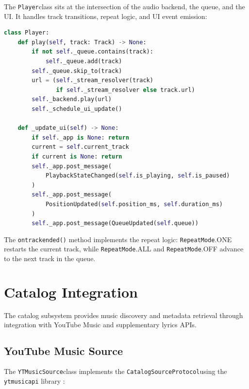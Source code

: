 \documentclass[a4paper,11pt,twoside]{article}
\newcommand{\protocol}{\texttt{Protocol}}
\newcommand{\repeatmode}{\texttt{RepeatMode}}
\newcommand{\catalogsource}{\texttt{CatalogSource}}
\newcommand{\player}{\texttt{Player}}
\newcommand{\ytmusicsource}{\texttt{YTMusicSource}}
\DeclareRobustCommand{\method}[1]{\texttt{\def\_{\textunderscore\allowbreak}#1}}
\newcommand{\ytmusicapi}{\texttt{ytmusicapi}\xspace}
\begin{document}
The \player class sits at the intersection of the audio backend, the queue,
and the UI. It handles track transitions, repeat logic, and UI event
emission:

\begin{lstlisting}[language=Python, caption={Player controller coordinating
backend, queue, and UI events.}]
class Player:
    def play(self, track: Track) -> None:
        if not self._queue.contains(track):
            self._queue.add(track)
        self._queue.skip_to(track)
        url = (self._stream_resolver(track)
               if self._stream_resolver else track.url)
        self._backend.play(url)
        self._schedule_ui_update()

    def _update_ui(self) -> None:
        if self._app is None: return
        current = self.current_track
        if current is None: return
        self._app.post_message(
            PlaybackStateChanged(self.is_playing, self.is_paused)
        )
        self._app.post_message(
            PositionUpdated(self.position_ms, self.duration_ms)
        )
        self._app.post_message(QueueUpdated(self.queue))
\end{lstlisting}

The \method{on\_track\_ended()} method implements the repeat logic:
\repeatmode.ONE restarts the current track, while \repeatmode.ALL and
\repeatmode.OFF advance to the next track in the queue.

\newpage

\section{Catalog Integration}

The catalog subsystem provides music discovery and metadata retrieval through
integration with YouTube Music and supplementary lyrics APIs.

\subsection{YouTube Music Source}

The \ytmusicsource class implements the \catalogsource \protocol using the
\ytmusicapi library \cite{ytmusicapi}:
\end{document}

